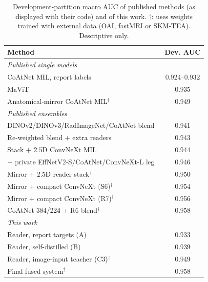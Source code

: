 \documentclass{ieeeaccess}
\begin{document}
\begin{table}[!t]
\centering
\caption{Development-partition macro AUC of published methods (as displayed with their code) and of this work.
$\dagger$: uses weights trained with external data (OAI, fastMRI or SKM-TEA). Descriptive only.}
\label{tab:compare}
\footnotesize
\setlength{\tabcolsep}{2.5pt}
\begin{tabular}{p{5.2cm}c}
\toprule
Method & Dev. AUC\\
\midrule
\multicolumn{2}{l}{\emph{Published single models}}\\
CoAtNet MIL, report labels~\cite{dread2026raptor} & 0.924--0.932\\
MaViT~\cite{hengck2026mavit} & 0.935\\
Anatomical-mirror CoAtNet MIL$^\dagger$~\cite{nartaa2026mirror} & 0.949\\
\midrule
\multicolumn{2}{l}{\emph{Published ensembles}}\\
DINOv2/DINOv3/RadImageNet/CoAtNet blend~\cite{mattiaangeli2026dino} & 0.941\\
Re-weighted blend + extra readers~\cite{jiweiliu2026fast} & 0.943\\
Stack + 2.5D ConvNeXt MIL~\cite{goodpjw2026stack} & 0.944\\
+ private EffNetV2-S/CoAtNet/ConvNeXt-L leg~\cite{pjm2026d4} & 0.946\\
Mirror + 2.5D reader stack$^\dagger$~\cite{sujan2026apex} & 0.950\\
Mirror + compact ConvNeXt (S6)$^\dagger$~\cite{heliosli2026blend} & 0.954\\
Mirror + compact ConvNeXt (R7)$^\dagger$~\cite{heliosli2026blend} & 0.956\\
CoAtNet 384/224 + R6 blend$^\dagger$~\cite{heliosli2026blend,goodpjw2026stack} & 0.958\\
\midrule
\multicolumn{2}{l}{\emph{This work}}\\
Reader, report targets (A) & 0.933\\
Reader, self-distilled (B) & 0.939\\
Reader, image-input teacher (C3)$^\dagger$ & 0.949\\
Final fused system$^\dagger$ & 0.958\\
\bottomrule
\end{tabular}
\end{table}
\end{document}

